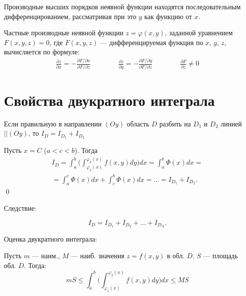 \documentclass[a4paper,12pt,oneside]{extbook}
\theoremstyle{numbered}
\theoremstyle{unnumbered}
\theoremstyle{named}
\theoremstyle{unnumbered}
\theoremstyle{named}
\theoremstyle{named}
\theoremstyle{named}
\renewenvironment{proof}{{\noindent\textsc{Доказательство.}}}{\qed}
\begin{document}
Производные высших порядков неявной функции находятся последовательным дифференцированием, рассматривая при это \(y\) как функцию от \(x\).

Частные производные неявной функции \(z = \varphi(x, y)\), заданной уравнением \(F(x, y, z) = 0\), где \(F(x, y, z)\) — дифференцируемая функция по \(x\), \(y\), \(z\), вычисляется по формуле:
\begin{gather*}
    \frac{\partial z}{\partial x} = -\frac{\partial F / \partial x}{\partial F / \partial z}
    \qquad \qquad
    \frac{\partial z}{\partial y} = -\frac{\partial F / \partial y}{\partial F / \partial z}
    \qquad \qquad
    \frac{\partial F}{\partial z} \neq 0
\end{gather*}

\section{Свойства двукратного интеграла}%
\label{sec:Свойства двукратного интеграла}

\begin{siderules}
    Если правильную в направлении \((Oy)\) область \(D\) разбить на \(D_1\) и \(D_2\) линией \(|| (Oy)\), то \(I_D = I_{D_1} + I_{D_2}\)
\end{siderules}

\begin{proof}
    Пусть \(x = C\) (\(a < c < b\)). Тогда
    \begin{equation}
        \begin{gathered}
            I_D = \int_a^b \Big( \int_{\varphi_1(x)}^{\varphi_2(x)} f(x, y)dy \Big)dx = \int_a^b \Phi(x)dx = \\ =
            \int_a^c \Phi(x)dx + \int_c^b \Phi(x)dx =
            \ldots =
            I_{D_1} + I_{D_2}.
        \end{gathered}
    \end{equation}
\end{proof}

Следствие:
\begin{siderules}
    \begin{equation}
        I_D = I_{D_1} + I_{D_2} + \ldots + I_{D_N}.
    \end{equation}
\end{siderules}

Оценка двукратного интеграла:
\begin{siderules}
    Пусть \(m\) — наим., \(M\) — наиб. значения \(z = f(x, y)\) в обл. \(D\). \(S\) — площадь обл. \(D\). Тогда:
    \begin{equation}
        mS \leq \int_a^b \Big( \int_{\varphi_1(x)}^{\varphi_2(x)} f(x, y)dy \Big)dx \leq MS
    \end{equation}
\end{siderules}
\end{document}
